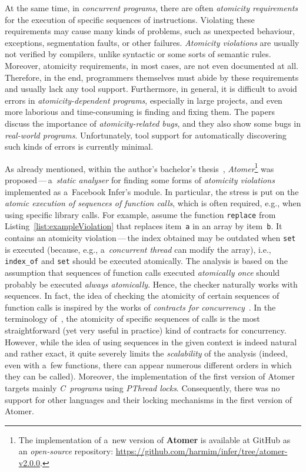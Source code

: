At the same time, in \emph{concurrent programs}, there are often \emph{atomicity requirements} for the execution of specific sequences of instructions. Violating these requirements may cause many kinds of problems, such as unexpected behaviour, exceptions, segmentation faults, or other failures. \emph{Atomicity violations} are usually not verified by compilers, unlike syntactic or some sorts of semantic rules. Moreover, atomicity requirements, in most cases, are not even documented at all. Therefore, in the end, programmers themselves must abide by these requirements and usually lack any tool support. Furthermore, in general, it is difficult to avoid errors in \emph{atomicity-dependent programs}, especially in large projects, and even more laborious and time-consuming is finding and fixing them. The papers~\cite{contracts2017, atomizer, contracts2015, atomicityOOP} discuss the importance of \emph{atomicity-related bugs}, and they also show some bugs in \emph{real-world programs}. Unfortunately, tool support for automatically discovering such kinds of errors is currently minimal.

As already mentioned, within the author's bachelor's thesis~\cite{harmimBP}, \emph{Atomer}\footnote{The implementation of a~new version of \textbf{Atomer} is available at GitHub as an \emph{open-source} repository: \url{https://github.com/harmim/infer/tree/atomer-v2.0.0}.} was proposed\,---\,a~\emph{static analyser} for finding some forms of \emph{atomicity violations} implemented as a~Facebook Infer's module. In particular, the stress is put on the \emph{atomic execution of sequences of function calls}, which is often required, e.g., when using specific library calls. For example, assume the function \texttt{replace} from Listing~\ref{list:exampleViolation} that replaces item~\texttt{a} in an array by item~\texttt{b}. It contains an atomicity violation\,---\,the index obtained may be outdated when \texttt{set} is executed (because, e.g., a~\emph{concurrent thread} can modify the array), i.e., \texttt{index\_of} and \texttt{set} should be executed atomically. The analysis is based on the assumption that sequences of function calls executed \emph{atomically once} should probably be executed \emph{always atomically}. Hence, the checker naturally works with sequences. In fact, the idea of checking the atomicity of certain sequences of function calls is inspired by the works of \emph{contracts for concurrency}~\cite{contracts2017, contracts2015}. In the terminology of~\cite{contracts2017, contracts2015}, the atomicity of specific sequences of calls is the most straightforward (yet very useful in practice) kind of contracts for concurrency. However, while the idea of using sequences in the given context is indeed natural and rather exact, it quite severely limits the \emph{scalability} of the analysis (indeed, even with a~few functions, there can appear numerous different orders in which they can be called). Moreover, the implementation of the first version of Atomer targets mainly \emph{C~programs} using \emph{PThread locks}. Consequently, there was no support for other languages and their locking mechanisms in the first version of Atomer.

